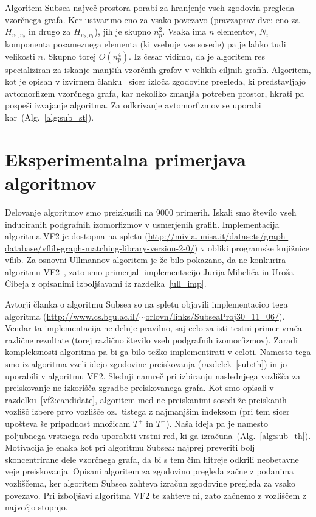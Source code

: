 \documentclass[a4paper, 12pt, ]{book}
\newcommand{\refalg}[1]{(Alg.~\ref{#1})}
\begin{document}
	Algoritem Subsea največ prostora porabi za hranjenje vseh zgodovin pregleda vzorčnega grafa. Ker ustvarimo eno za vsako povezavo (pravzaprav dve:
	eno za $H_{v_1, v_2}$ in drugo za $H_{v_2, v_1}$), jih je skupno $n_p^2$. Vsaka ima $n$ elementov, $N_i$ komponenta posameznega elementa (ki
	vsebuje vse sosede) pa je lahko tudi velikosti $n$. Skupno torej $O(n_p^4)$. Iz česar vidimo, da je algoritem res specializiran za iskanje manjših 
	vzorčnih grafov v velikih ciljnih grafih. Algoritem, kot je opisan v izvirnem članku~\cite{subsea} sicer izloča zgodovine pregleda, ki predstavljajo
	avtomorfizem vzorčnega grafa, kar nekoliko zmanjša potreben prostor, hkrati pa pospeši izvajanje algoritma. Za odkrivanje avtomorfizmov se uporabi 
	kar~\refalg{alg:sub_st}.




\chapter{Eksperimentalna primerjava algoritmov}

	Delovanje algoritmov smo preizkusili na 9000 primerih. Iskali smo število vseh induciranih podgrafnih izomorfizmov v usmerjenih grafih. Implementacija
	algoritma VF2 je dostopna na spletu (\href{http://mivia.unisa.it/datasets/graph-database/vflib-graph-matching-library-version-2-0/}
	{http://mivia.unisa.it/datasets/graph-database/{\allowbreak}vflib-graph-matching-library-version-2-0/}) v obliki programske knjižnice vflib. Za osnovni
	Ullmannov algoritem je že bilo
	pokazano, da ne konkurira algoritmu VF2~\cite{vf2_2}, zato smo primerjali implementacijo Jurija Miheliča in Uroša Čibeja z opisanimi izboljšavami
	iz razdelka~\ref{ull_imp}.

	Avtorji članka o algoritmu Subsea so na spletu objavili implementacico tega algoritma 
	(\href{http://www.cs.bgu.ac.il/~orlovn/links/SubseaProj30\_11\_06/}{http://www.cs.bgu.ac.il/$\sim$orlovn/links/SubseaProj30\_11\_06/}). Vendar ta
	implementacija ne deluje pravilno, saj celo za isti testni primer vrača različne rezultate (torej različno število vseh podgrafnih izomorfizmov). Zaradi
	kom\-pleksnosti algoritma pa bi ga bilo težko implementirati v celoti. Namesto tega smo iz algoritma vzeli idejo zgodovine preiskovanja 
	(razdelek~\ref{sub:th}) in jo uporabili
	v algoritmu VF2. Slednji namreč pri izbiranju naslednjega vozlišča za preiskovanje ne izkorišča zgradbe preiskovanega grafa. Kot smo opisali v 
	razdelku~\ref{vf2:candidate}, algoritem med ne-preiskanimi sosedi že preiskanih vozlišč izbere prvo vozlišče oz.~tistega z najmanjšim indeksom (pri tem 
	sicer upošteva še pripadnost množicam $T^+$ in $T^-$). Naša ideja pa je namesto poljubnega vrstnega reda uporabiti vrstni red, ki ga 
	izračuna~\refalg{alg:sub_th}. Motivacija je enaka kot pri algoritmu Subsea: najprej preveriti bolj skoncentrirane dele vzorčnega grafa, da bi s tem čim
	hitreje odkrili neobetavne veje preiskovanja. Opisani algoritem za zgodovino pregleda začne z podanima vozliščema, ker algoritem Subsea zahteva 
	izračun zgodovine pregleda za vsako povezavo. Pri izboljšavi algoritma VF2 te zahteve ni, zato začnemo z vozliščem z največjo stopnjo.
	
\end{document}
